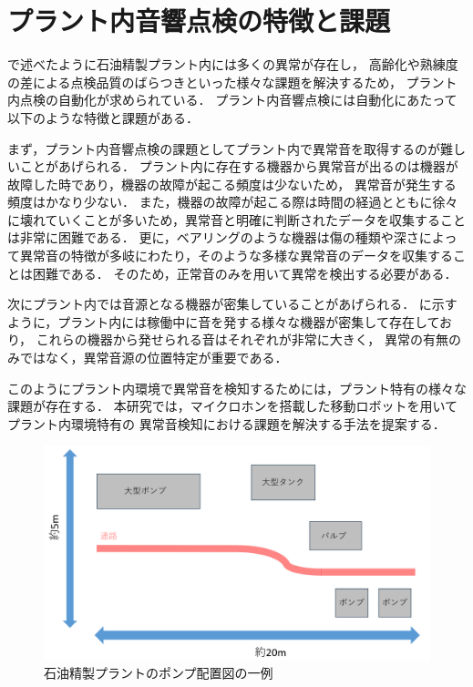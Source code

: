 \documentclass[../main]{subfiles}
\begin{document}
\section{プラント内音響点検の特徴と課題}
\label{sec:intro_anomaly-detection}
で述べたように石油精製プラント内には多くの異常が存在し，
高齢化や熟練度の差による点検品質のばらつきといった様々な課題を解決するため，
プラント内点検の自動化が求められている．
プラント内音響点検には自動化にあたって以下のような特徴と課題がある．


まず，プラント内音響点検の課題としてプラント内で異常音を取得するのが難しいことがあげられる．
プラント内に存在する機器から異常音が出るのは機器が故障した時であり，機器の故障が起こる頻度は少ないため，
異常音が発生する頻度はかなり少ない．
また，機器の故障が起こる際は時間の経過とともに徐々に壊れていくことが多いため，異常音と明確に判断されたデータを収集することは非常に困難である．
更に，ベアリングのような機器は傷の種類や深さによって異常音の特徴が多岐にわたり，そのような多様な異常音のデータを収集することは困難である．
そのため，正常音のみを用いて異常を検出する必要がある．

次にプラント内では音源となる機器が密集していることがあげられる．
に示すように，プラント内には稼働中に音を発する様々な機器が密集して存在しており，
これらの機器から発せられる音はそれぞれが非常に大きく，
異常の有無のみではなく，異常音源の位置特定が重要である．

このようにプラント内環境で異常音を検知するためには，プラント特有の様々な課題が存在する．
本研究では，マイクロホンを搭載した移動ロボットを用いてプラント内環境特有の
異常音検知における課題を解決する手法を提案する．

\begin{figure}[t]
  \centering
  \includegraphics[keepaspectratio, width=1.0\linewidth]{chap1/pump_location.png}
  \caption{石油精製プラントのポンプ配置図の一例}
  \label{fig:pump_location}
\end{figure}
\end{document}
